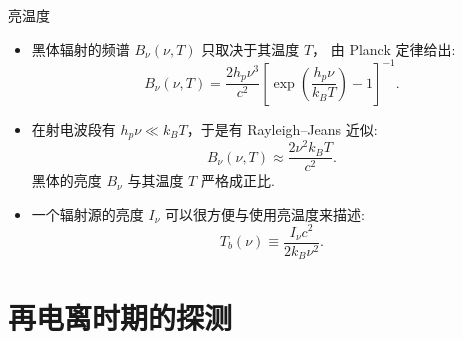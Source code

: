 \documentclass{beamer}
\begin{document}
\begin{frame}{亮温度}
  \begin{itemize}
    \item \alert{黑体辐射}的频谱 $B_{\nu}(\nu, T)$ 只取决于其温度 $T$，
      由 \alert{Planck 定律}给出:
      \begin{equation}
        B_{\nu}(\nu, T) =
          \frac{2 h_p \nu^3}{c^2} \left[ \exp\left(
            \frac{h_p \nu}{k_B T} \right) - 1 \right]^{-1} .
      \end{equation}
    \item 在射电波段有 $h_p \nu \ll k_B T$，于是有 \alert{Rayleigh--Jeans 近似}:
      \begin{equation}
        B_{\nu}(\nu, T) \approx \frac{2 \nu^2 k_B T}{c^2} .
      \end{equation}
      黑体的亮度 $B_{\nu}$ 与其温度 $T$ 严格成正比.
    \item 一个辐射源的亮度 $I_{\nu}$ 可以很方便与使用\alert{亮温度}来描述:
      \begin{equation}
        T_b(\nu) \equiv \frac{I_{\nu} c^2}{2 k_B \nu^2} .
      \end{equation}
  \end{itemize}
\end{frame}


\section{再电离时期的探测}
\end{document}
